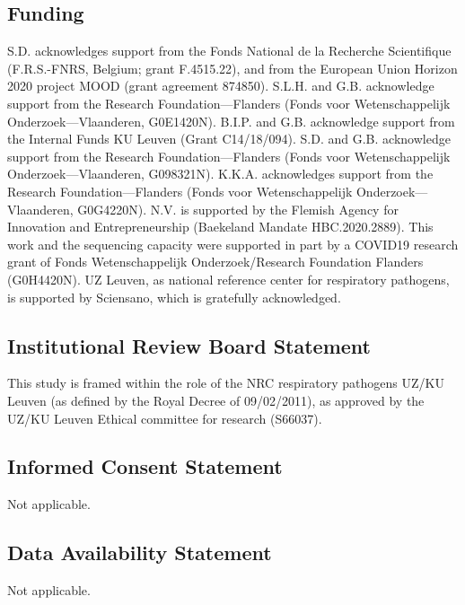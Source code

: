 \subsection*{Funding}
S.D. acknowledges support from the Fonds National de la Recherche Scientifique (F.R.S.-FNRS, Belgium; grant F.4515.22), and from the European Union Horizon 2020 project MOOD (grant agreement 874850).
S.L.H. and G.B. acknowledge support from the Research Foundation—Flanders (Fonds voor Wetenschappelijk Onderzoek—Vlaanderen, G0E1420N).
B.I.P. and G.B. acknowledge support from the Internal Funds KU Leuven (Grant C14/18/094).
S.D. and G.B. acknowledge support from the Research Foundation—Flanders (Fonds voor Wetenschappelijk Onderzoek—Vlaanderen, G098321N).
K.K.A. acknowledges support from the Research Foundation—Flanders (Fonds voor Wetenschappelijk Onderzoek—Vlaanderen, G0G4220N).
N.V. is supported by the Flemish Agency for Innovation and Entrepreneurship (Baekeland Mandate HBC.2020.2889).
This work and the sequencing capacity were supported in part by a COVID19 research grant of Fonds Wetenschappelijk Onderzoek/Research Foundation Flanders (G0H4420N).
UZ Leuven, as national reference center for respiratory pathogens, is supported by Sciensano, which is gratefully acknowledged.

\subsection*{Institutional Review Board Statement}
This study is framed within the role of the NRC respiratory pathogens UZ/KU Leuven (as defined by the Royal Decree of 09/02/2011), as approved by the UZ/KU Leuven Ethical committee for research (S66037).

\subsection*{Informed Consent Statement}
Not applicable.

\subsection*{Data Availability Statement}
Not applicable.


